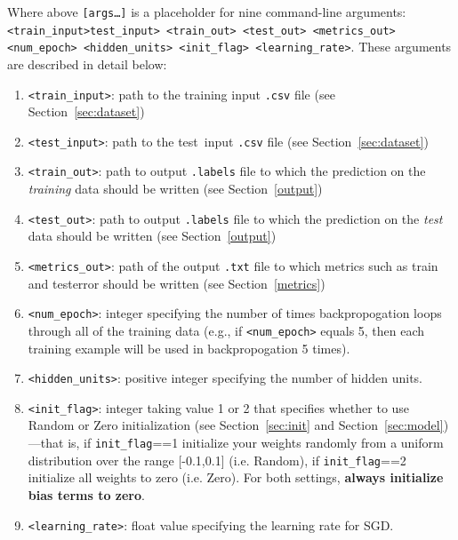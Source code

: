 \documentclass[11pt]{exam}
\numberwithin{equation}{section} %
\numberwithin{figure}{section} %
\numberwithin{table}{section} %
\newcommand{\ntset}{test}
\begin{document}
Where above \texttt{[args\dots]} is a placeholder for nine command-line arguments: \texttt{<train\_input>}\newline \texttt{\ntset\_input> <train\_out> <\ntset\_out> <metrics\_out> <num\_epoch> \newline <hidden\_units>  <init\_flag> <learning\_rate>}. These arguments are described in detail below:
\begin{enumerate}
    \item \texttt{<train\_input>}: path to the training input \texttt{.csv} file (see Section~\ref{sec:dataset})
    \item \texttt{<\ntset\_input>}: path to the \ntset \ input \texttt{.csv} file (see Section~\ref{sec:dataset})
    \item \texttt{<train\_out>}: path to output \texttt{.labels} file to which the prediction on the \emph{training} data should be written (see Section~\ref{output})
    \item \texttt{<\ntset\_out>}: path to output \texttt{.labels} file to which the prediction on the \emph{\ntset} data should be written (see Section~\ref{output})
    \item \texttt{<metrics\_out>}: path of the output \texttt{.txt} file to which metrics such as train and \ntset\thinspace error should be written (see Section~\ref{metrics})
    \item \texttt{<num\_epoch>}: integer specifying the number of times backpropogation loops through all of the training data (e.g., if \texttt{<num\_epoch>} equals 5, then each training example will be used in backpropogation 5 times).
    \item \texttt{<hidden\_units>}: positive integer specifying the number of hidden units. 
    \item \texttt{<init\_flag>}: integer taking value 1 or 2 that specifies whether to use {\sc Random} or {\sc Zero} initialization (see Section~\ref{sec:init} and Section~\ref{sec:model})---that is, if \lstinline{init_flag}==1 initialize your weights randomly from a uniform distribution over the range [-0.1,0.1] (i.e. {\sc Random}), if \lstinline{init_flag}==2 initialize all weights to zero (i.e. {\sc Zero}). For both settings, {\bf always initialize bias terms to zero}.
    \item \texttt{<learning\_rate>}: float value specifying the learning rate for SGD.
    
\end{enumerate}
\end{document}
